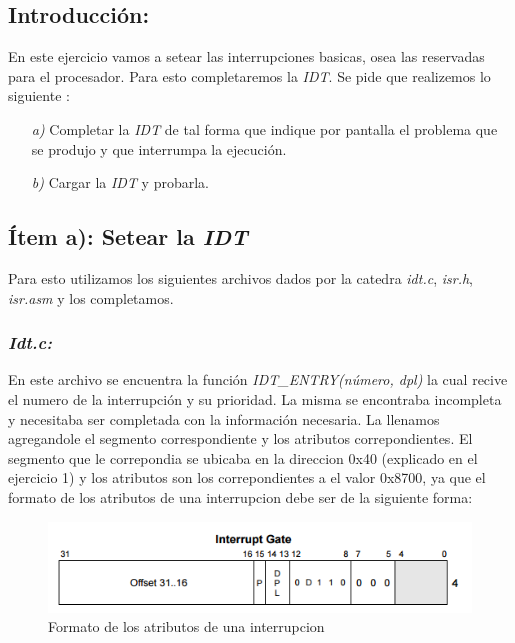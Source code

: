 \subsection{Introducción:}

En este ejercicio vamos a setear las interrupciones basicas, osea las reservadas para el procesador. Para esto completaremos la \textit{IDT}. Se pide que realizemos lo siguiente :

\begin{itemize}
\item [\textit{a)}] Completar la \textit{IDT} de tal forma que indique por pantalla el problema que se produjo y que interrumpa la ejecución.
\item [\textit{b)}] Cargar la  \textit{IDT} y probarla.
\end{itemize}

\subsection{Ítem a): Setear la \textit{IDT}}

Para esto utilizamos los siguientes archivos dados por la catedra   \textit{idt.c}, \textit{isr.h}, \textit{isr.asm} y los completamos. 

 \subsubsection{{\large \textit{Idt.c:}}}
 En este archivo se encuentra la función \textit{IDT\_ENTRY(número, dpl)} la cual recive el numero de la interrupción y su prioridad. La misma se encontraba incompleta y necesitaba ser completada con la información necesaria. La llenamos agregandole el segmento correspondiente y los atributos correpondientes. El segmento que le correpondia se ubicaba en la direccion 0x40 (explicado en el ejercicio 1) y los atributos son los correpondientes a el valor  0x8700, ya que el formato de los atributos de una interrupcion debe ser de la siguiente forma:

 \begin{figure}[H]
\begin{center}
  \includegraphics[width=\linewidth]{ejercicio2/interrupcion.png}
  \caption{{\small Formato de los atributos de una interrupcion} }
\endminipage
\end{center}
\end{figure}

